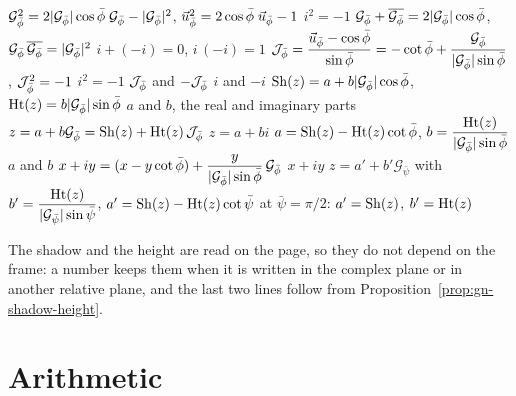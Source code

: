\begin{gnlaws}
  {$\Gp^2 = 2|\Gp|\cos\pb\;\Gp - |\Gp|^2$, \quad $\up^2 = 2\cos\pb\;\up - 1$}
  {$i^2 = -1$}
  {$\Gp + \overline{\Gp} = 2|\Gp|\cos\pb$, \quad $\Gp\,\overline{\Gp} = |\Gp|^2$}
  {$i + (-i) = 0$, \quad $i\,(-i) = 1$}
  {$\Jp = \dfrac{\up - \cos\pb}{\sin\pb} = -\cot\pb + \dfrac{\Gp}{|\Gp|\sin\pb}$, \quad $\Jp^2 = -1$}
  {$i^2 = -1$}
  {$\Jp$ and $-\Jp$}
  {$i$ and $-i$}
  {$\Sh(z) = a + b|\Gp|\cos\pb$, \quad $\Ht(z) = b|\Gp|\sin\pb$}
  {$a$ and $b$, the real and imaginary parts}
  {$z = a + b\Gp = \Sh(z) + \Ht(z)\,\Jp$}
  {$z = a + bi$}
  {$a = \Sh(z) - \Ht(z)\cot\pb$, \quad $b = \dfrac{\Ht(z)}{|\Gp|\sin\pb}$}
  {$a$ and $b$}
  {$x + iy = (x - y\cot\pb) + \dfrac{y}{|\Gp|\sin\pb}\,\Gp$}
  {$x + iy$}
  {$z = a' + b'\mathcal{G}_{\bar{\psi}}$ with $b' = \dfrac{\Ht(z)}{|\mathcal{G}_{\bar{\psi}}|\sin\bar{\psi}}$, \quad $a' = \Sh(z) - \Ht(z)\cot\bar{\psi}$}
  {at $\bar{\psi} = \pi/2$: \newline $a' = \Sh(z)$, \quad $b' = \Ht(z)$}
\end{gnlaws}
The shadow and the height are read on the page, so they do not depend on the frame: a number keeps them when it is written in the complex plane or in another relative plane, and the last two lines follow from Proposition~\ref{prop:gn-shadow-height}.

\section{Arithmetic}\label{app:f-arithmetic}

